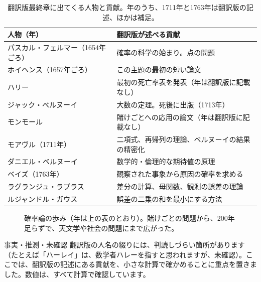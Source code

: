 \documentclass[a4paper,11pt,openany]{ltjsbook}
\begin{document}
\begin{table}[htbp]
\centering
\begin{tabular}{lp{7.5cm}}
\toprule
人物（年） & 翻訳版が述べる貢献\\
\midrule
パスカル・フェルマー（1654年ごろ） & 確率の科学の始まり。点の問題\\
ホイヘンス（1657年ごろ） & この主題の最初の短い論文\\
ハリー & 最初の死亡率表を発表（年は翻訳版に記載なし）\\
ジャック・ベルヌーイ & 大数の定理。死後に出版（1713年）\\
モンモール & 賭けごとへの応用の論文（年は翻訳版に記載なし）\\
モアヴル（1711年） & 二項式、再帰列の理論、ベルヌーイの結果の精密化\\
ダニエル・ベルヌーイ & 数学的・倫理的な期待値の原理\\
ベイズ（1763年） & 観察された事象から原因の確率を求める\\
ラグランジュ・ラプラス & 差分の計算、母関数、観測の誤差の理論\\
ルジャンドル・ガウス & 誤差の二乗の和を最小にする方法\\
\bottomrule
\end{tabular}
\caption{翻訳版最終章に出てくる人物と貢献。年のうち、1711年と1763年は翻訳版の記述、ほかは補足。}
\end{table}

\begin{figure}[htbp]
\centering
{}
\caption{確率論の歩み（年は上の表のとおり）。賭けごとの問題から、200年足らずで、天文学や社会の問題にまで広がった。}
\end{figure}

\begin{notebox}{事実・推測・未確認}
翻訳版の人名の綴りには、判読しづらい箇所があります（たとえば「ハーレイ」は、数学者ハレーを指すと思われますが、未確認）。ここでは、翻訳版の記述にある貢献を、小さな計算で確かめることに重点を置きました。数値は、すべて計算で確認しています。
\end{notebox}
\end{document}
